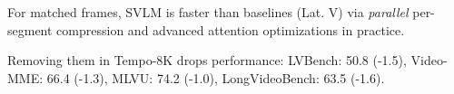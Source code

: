 \vspace{-0.2em}
For matched frames, SVLM is faster than baselines (Lat. V) via \textit{parallel} per-segment compression and advanced attention optimizations in practice.

\vspace{-0.2em}
Removing them in Tempo-8K drops performance: LVBench: 50.8 (-1.5), Video-MME: 66.4 (-1.3), MLVU: 74.2 (-1.0), LongVideoBench: 63.5 (-1.6).

